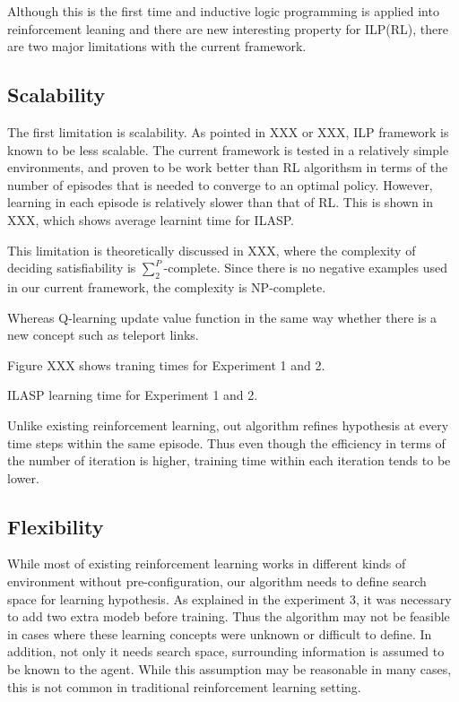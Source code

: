 Although this is the first time and inductive logic programming is applied into reinforcement leaning and there are new interesting property for ILP(RL),
there are two major limitations with the current framework.

\subsection{Scalability}
The first limitation is scalability. As pointed in XXX or XXX,
ILP framework is known to be less scalable. The current framework is tested in a relatively simple environments, 
and proven to be work better than RL algorithsm in terms of the number of episodes that is needed to converge to an optimal policy.
However, learning in each episode is relatively slower than that of RL. 
This is shown in XXX, which shows average learnint time for ILASP. 

This limitation is theoretically discussed in XXX, where the complexity of deciding satisfiability is 
$\sum_{2}^{P}$-complete. Since there is no negative examples used in our current framework, the complexity is NP-complete.

Whereas Q-learning update value function in the same way whether there is a new concept such as teleport links.

Figure XXX shows traning times for Experiment 1 and 2.

ILASP learning time for Experiment 1 and 2. 

Unlike existing reinforcement learning,
out algorithm refines hypothesis at every time steps within the same episode.
Thus even though the efficiency in terms of the number of iteration is higher,
training time within each iteration tends to be lower.

\subsection{Flexibility}
While most of existing reinforcement learning works in different kinds of environment without pre-configuration, our algorithm
needs to define search space for learning hypothesis. As explained in the experiment 3, it was necessary to add two extra modeb before training.
Thus the algorithm may not be feasible in cases where these learning concepts were unknown or difficult to define. 
In addition, not only it needs search space, surrounding information is assumed to be known to the agent. 
While this assumption may be reasonable in many cases, this is not common in traditional reinforcement learning setting.

